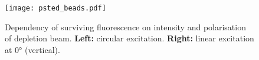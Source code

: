 \begin{figure}
	\centering
	\texttt{[image: psted\_beads.pdf]}
	\caption{
		Dependency of surviving fluorescence on intensity and polarisation of depletion beam. \textbf{Left:} circular excitation. \textbf{Right:} linear excitation at 0° (vertical). 
	}
	\label{fig:psted beads}
\end{figure}





























